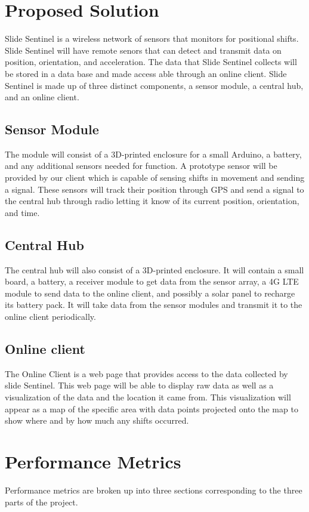 \documentclass[onecolumn, draftclsnofoot,10pt, compsoc]{IEEEtran}
\begin{document}
\section{Proposed Solution}
Slide Sentinel is a wireless network of sensors that monitors for positional shifts. Slide Sentinel will have remote senors that can detect and transmit data on position, orientation, and acceleration. The data that Slide Sentinel collects will be stored in a data base and made access able through an online client. Slide Sentinel is made up of three distinct components, a sensor module, a central hub, and an online client.

\subsection{Sensor Module}
The module will consist of a 3D-printed enclosure for a small Arduino, a battery, and any additional sensors needed for function. A prototype sensor will be provided by our client which is capable of sensing shifts in movement and sending a signal. These sensors will track their position through GPS and send a signal to the central hub through radio letting it know of its current position, orientation, and time. 

\subsection{Central Hub}
The central hub will also consist of a 3D-printed enclosure. It will contain a small board, a battery, a receiver module to get data from the sensor array, a 4G LTE module to send data to the online client, and possibly a solar panel to recharge its battery pack. It will take data from the sensor modules and transmit it to the online client periodically.
\subsection{Online client}
The Online Client is a web page that provides access to the data collected by slide Sentinel. This web page will be able to display raw data as well as a visualization of the data and the location it came from. This visualization will appear as a map of the specific area with data points projected onto the map to show where and by how much any shifts occurred. 

\section{Performance Metrics}
Performance metrics are broken up into three sections corresponding to the three parts of the project.
\end{document}
